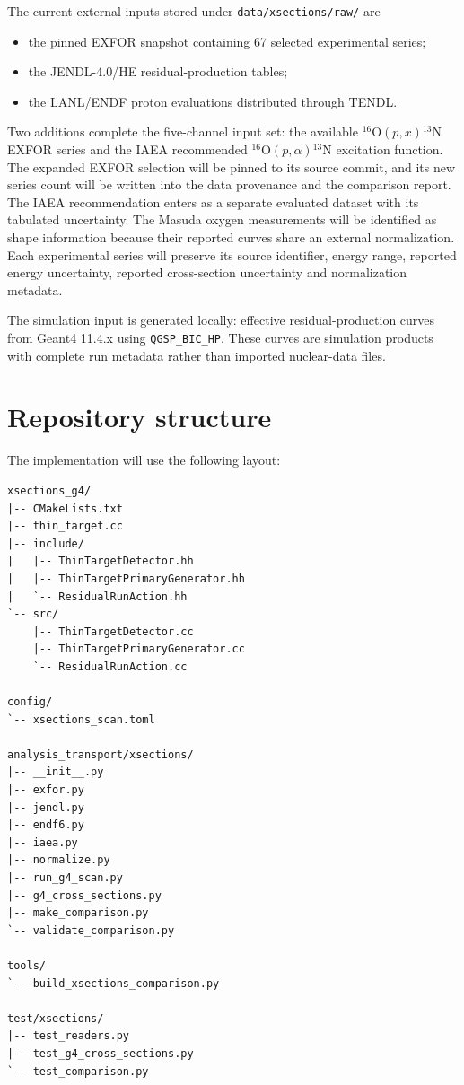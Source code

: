 \documentclass[11pt]{article}
\newcommand{\file}[1]{\texttt{#1}}
\newcommand{\Ox}[1]{{}^{#1}\mathrm{O}}
\newcommand{\Ni}[1]{{}^{#1}\mathrm{N}}
\begin{document}
The current external inputs stored under \file{data/xsections/raw/} are
\begin{itemize}[nosep]
  \item the pinned EXFOR snapshot containing 67 selected experimental series;
  \item the JENDL-4.0/HE residual-production tables;
  \item the LANL/ENDF proton evaluations distributed through TENDL.
\end{itemize}
Two additions complete the five-channel input set: the available
$\Ox{16}(p,x)\Ni{13}$ EXFOR series and the IAEA recommended
$\Ox{16}(p,\alpha)\Ni{13}$ excitation function.  The expanded EXFOR selection
will be pinned to its source commit, and its new series count will be written
into the data provenance and the comparison report.  The IAEA recommendation
enters as a separate evaluated dataset with its tabulated uncertainty.
The Masuda oxygen measurements will be identified as shape information because
their reported curves share an external normalization.  Each experimental
series will preserve its source identifier, energy range, reported energy
uncertainty, reported cross-section uncertainty and normalization metadata.

The simulation input is generated locally: effective residual-production
curves from Geant4 11.4.x using \file{QGSP\_BIC\_HP}.  These curves are simulation
products with complete run metadata rather than imported nuclear-data files.

\section{Repository structure}

The implementation will use the following layout:
\begin{verbatim}
xsections_g4/
|-- CMakeLists.txt
|-- thin_target.cc
|-- include/
|   |-- ThinTargetDetector.hh
|   |-- ThinTargetPrimaryGenerator.hh
|   `-- ResidualRunAction.hh
`-- src/
    |-- ThinTargetDetector.cc
    |-- ThinTargetPrimaryGenerator.cc
    `-- ResidualRunAction.cc

config/
`-- xsections_scan.toml

analysis_transport/xsections/
|-- __init__.py
|-- exfor.py
|-- jendl.py
|-- endf6.py
|-- iaea.py
|-- normalize.py
|-- run_g4_scan.py
|-- g4_cross_sections.py
|-- make_comparison.py
`-- validate_comparison.py

tools/
`-- build_xsections_comparison.py

test/xsections/
|-- test_readers.py
|-- test_g4_cross_sections.py
`-- test_comparison.py
\end{verbatim}
\end{document}
